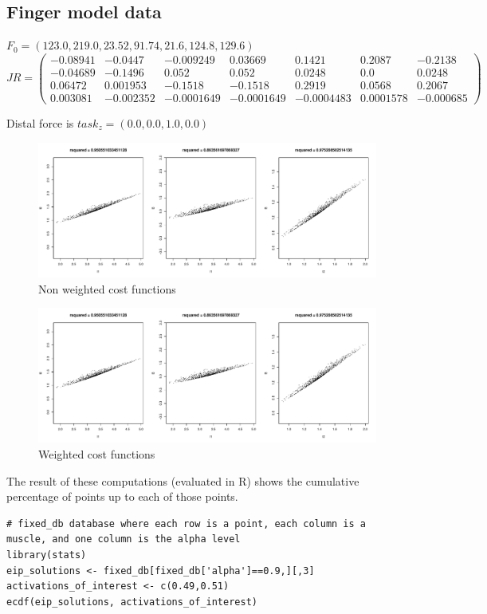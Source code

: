 \subsection{Finger model data}
$F_0 = (123.0, 219.0, 23.52, 91.74,	21.6, 124.8, 129.6)$\\
$
JR = 
\begin{pmatrix}
-0.08941 & -0.0447 & -0.009249 & 0.03669 & 0.1421 & 0.2087 & -0.2138 \\
-0.04689 & -0.1496 & 0.052 &0.052 & 0.0248 & 0.0 & 0.0248 \\ 
0.06472 & 0.001953 & -0.1518 &-0.1518 & 0.2919 & 0.0568 & 0.2067 \\
0.003081 & -0.002352 & -0.0001649 & -0.0001649 & -0.0004483 & 0.0001578 & -0.000685
\end{pmatrix}$

Distal force is $task_z = (0.0,0.0,1.0,0.0)$

\begin{figure}[h]
\centering
\includegraphics[width=\textwidth,page=1]{figs/cost_function_scatterplots.pdf}
\caption{Non weighted cost functions}
\label{fig:unweighted_cost_functions}
\end{figure}

\begin{figure}[h]
\centering
\includegraphics[width=\textwidth,page=2]{figs/cost_function_scatterplots.pdf}
\caption{Weighted cost functions}
\label{fig:weighted_cost_functions}
\end{figure}
The result of these computations (evaluated in R) shows the cumulative percentage of points up to each of those points.
\begin{verbatim}
# fixed_db database where each row is a point, each column is a muscle, and one column is the alpha level
library(stats)
eip_solutions <- fixed_db[fixed_db['alpha']==0.9,][,3]
activations_of_interest <- c(0.49,0.51)
ecdf(eip_solutions, activations_of_interest)
\end{verbatim}

